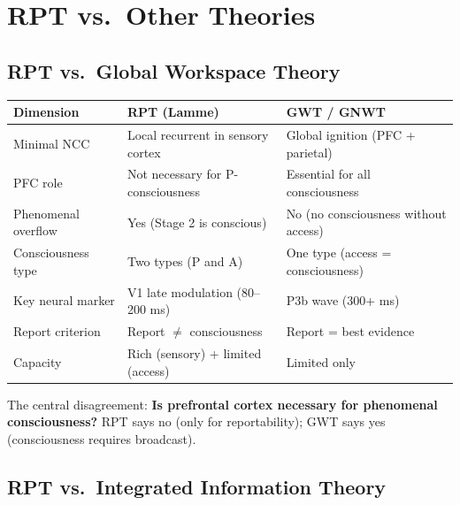 \documentclass[11pt,a4paper]{report}
\begin{document}
\chapter{RPT vs.\ Other Theories}

\section{RPT vs.\ Global Workspace Theory}

\begin{compbox}
\renewcommand{\arraystretch}{1.4}
\begin{tabular}{>{\raggedright}p{3cm} >{\raggedright}p{5cm} >{\raggedright\arraybackslash}p{5cm}}
  \toprule
  \textbf{Dimension} & \textbf{RPT (Lamme)} & \textbf{GWT / GNWT} \\
  \midrule
  Minimal NCC & Local recurrent in sensory cortex & Global ignition (PFC + parietal) \\
  PFC role & Not necessary for P-consciousness & Essential for all consciousness \\
  Phenomenal overflow & Yes (Stage 2 is conscious) & No (no consciousness without access) \\
  Consciousness type & Two types (P and A) & One type (access = consciousness) \\
  Key neural marker & V1 late modulation (80--200 ms) & P3b wave (300+ ms) \\
  Report criterion & Report $\neq$ consciousness & Report = best evidence \\
  Capacity & Rich (sensory) + limited (access) & Limited only \\
  \bottomrule
\end{tabular}
\end{compbox}

The central disagreement: \textbf{Is prefrontal cortex necessary for phenomenal consciousness?} RPT says no (only for reportability); GWT says yes (consciousness requires broadcast).

\section{RPT vs.\ Integrated Information Theory}
\end{document}
